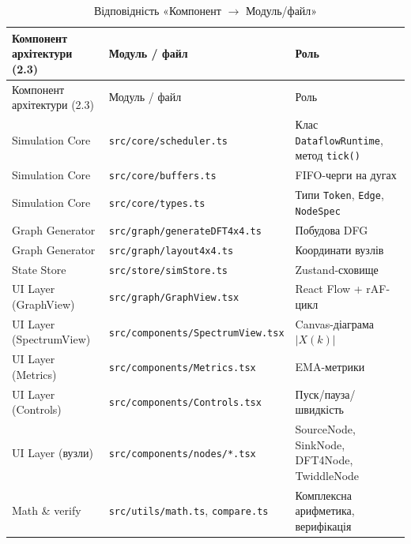 \begin{longtable}[]{@{}
  >{\raggedright\arraybackslash}p{}
  >{\raggedright\arraybackslash}p{}
  >{\raggedright\arraybackslash}p{}@{}}
\caption{\protect{}\label{tab:arch_to_code}{}Відповідність
«Компонент \(\rightarrow\) Модуль/файл»}\tabularnewline
\toprule\noalign{}
\begin{minipage}[b]{\linewidth}\raggedright
Компонент архітектури (2.3)
\end{minipage} & \begin{minipage}[b]{\linewidth}\raggedright
Модуль / файл
\end{minipage} & \begin{minipage}[b]{\linewidth}\raggedright
Роль
\end{minipage} \\
\midrule\noalign{}
\endfirsthead
\toprule\noalign{}
\begin{minipage}[b]{\linewidth}\raggedright
Компонент архітектури (2.3)
\end{minipage} & \begin{minipage}[b]{\linewidth}\raggedright
Модуль / файл
\end{minipage} & \begin{minipage}[b]{\linewidth}\raggedright
Роль
\end{minipage} \\
\midrule\noalign{}
\endhead
\bottomrule\noalign{}
\endlastfoot
Simulation Core & \texttt{src/core/scheduler.ts} & Клас
\texttt{DataflowRuntime}, метод \texttt{tick()} \\
Simulation Core & \texttt{src/core/buffers.ts} & FIFO-черги на дугах \\
Simulation Core & \texttt{src/core/types.ts} & Типи \texttt{Token},
\texttt{Edge}, \texttt{NodeSpec} \\
Graph Generator & \texttt{src/graph/generateDFT4x4.ts} & Побудова DFG \\
Graph Generator & \texttt{src/graph/layout4x4.ts} & Координати вузлів \\
State Store & \texttt{src/store/simStore.ts} & Zustand-сховище \\
UI Layer (GraphView) & \texttt{src/graph/GraphView.tsx} & React Flow +
rAF-цикл \\
UI Layer (SpectrumView) & \texttt{src/components/SpectrumView.tsx} &
Canvas-діаграма \(|X(k)|\) \\
UI Layer (Metrics) & \texttt{src/components/Metrics.tsx} &
EMA-метрики \\
UI Layer (Controls) & \texttt{src/components/Controls.tsx} &
Пуск/пауза/швидкість \\
UI Layer (вузли) & \texttt{src/components/nodes/*.tsx} & SourceNode,
SinkNode, DFT4Node, TwiddleNode \\
Math \& verify & \texttt{src/utils/math.ts}, \texttt{compare.ts} &
Комплексна арифметика, верифікація \\
\end{longtable}

